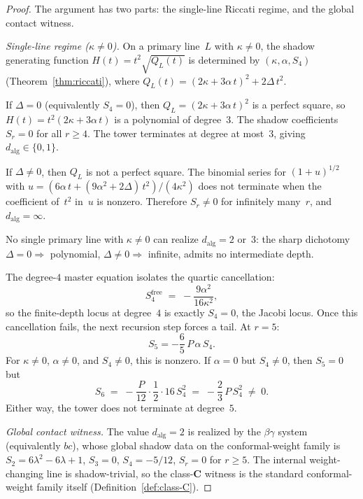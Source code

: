 \documentclass[11pt,reqno]{amsart}
\theoremstyle{definition}
\theoremstyle{remark}
\numberwithin{equation}{section}
\begin{document}
\begin{proof}
The argument has two parts: the single-line Riccati
regime, and the global contact witness.

\emph{Single-line regime ($\kappa \ne 0$).}
On a primary line~$L$ with $\kappa \ne 0$, the shadow
generating function
$H(t) = t^2\sqrt{Q_L(t)}$ is determined by
$(\kappa, \alpha, S_4)$
(Theorem~\ref{thm:riccati}), where
$Q_L(t) = (2\kappa + 3\alpha\, t)^2 + 2\Delta\, t^2$.

If $\Delta = 0$ (equivalently $S_4 = 0$), then
$Q_L = (2\kappa + 3\alpha\, t)^2$ is a perfect square, so
$H(t) = t^2(2\kappa + 3\alpha\, t)$ is a polynomial of
degree~$3$. The shadow coefficients $S_r = 0$ for all
$r \ge 4$. The tower terminates at degree at most~$3$,
giving $d_{\mathrm{alg}} \in \{0, 1\}$.

If $\Delta \ne 0$, then $Q_L$ is not a perfect square.
The binomial series for
$(1 + u)^{1/2}$ with
$u = (6\alpha\, t + (9\alpha^2 + 2\Delta)\, t^2)/(4\kappa^2)$
does not terminate when the coefficient of~$t^2$
in~$u$ is nonzero. Therefore $S_r \ne 0$ for infinitely
many~$r$, and $d_{\mathrm{alg}} = \infty$.

No single primary line with $\kappa \ne 0$ can realize
$d_{\mathrm{alg}} = 2$ or~$3$: the sharp dichotomy
$\Delta = 0 \Rightarrow$ polynomial,
$\Delta \ne 0 \Rightarrow$ infinite, admits no intermediate
depth.

The degree-$4$ master equation isolates the quartic
cancellation:
\[
 S_4^{\mathrm{free}}
 \;=\;
 -\frac{9\alpha^2}{16\kappa^2},
\]
so the finite-depth locus at degree~$4$ is exactly
$S_4 = 0$, the Jacobi locus. Once this cancellation fails,
the next recursion step forces a tail. At $r = 5$:
\[
 S_5 = -\frac{6}{5}\, P\, \alpha\, S_4.
\]
For $\kappa \ne 0$, $\alpha \ne 0$, and $S_4 \ne 0$,
this is nonzero. If $\alpha = 0$ but $S_4 \ne 0$, then
$S_5 = 0$ but
\[
 S_6
 \;=\;
 -\frac{P}{12} \cdot \frac{1}{2} \cdot 16\, S_4^2
 \;=\;
 -\frac{2}{3}\, P\, S_4^2
 \;\ne\; 0.
\]
Either way, the tower does not terminate at
degree~$5$.

\emph{Global contact witness.}
The value $d_{\mathrm{alg}} = 2$ is realized by the
$\beta\gamma$ system (equivalently $bc$), whose global
shadow data on the conformal-weight family is
$S_2 = 6\lambda^2 - 6\lambda + 1$, $S_3 = 0$,
$S_4 = -5/12$, $S_r = 0$ for $r \ge 5$.
The internal weight-changing line is shadow-trivial, so the
class-$\mathbf{C}$ witness is the standard conformal-weight
family itself (Definition~\ref{def:class-C}).
\end{proof}
\end{document}
